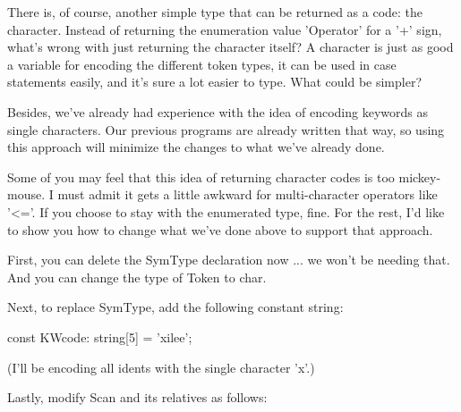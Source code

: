 \documentclass[float=false, crop=false]{standalone}
\begin{document}
There is, of course, another simple type that can be returned as a code: the
character. Instead of returning the enumeration value 'Operator' for a '+' sign,
what's wrong with just returning the character itself? A character is just as
good a variable for encoding the different token types, it can be used in case
statements easily, and it's sure a lot easier to type. What could be simpler?

Besides, we've already had experience with the idea of encoding keywords as
single characters. Our previous programs are already written that way, so using
this approach will minimize the changes to what we've already done.

Some of you may feel that this idea of returning character codes is too
mickey-mouse. I must admit it gets a little awkward for multi-character
operators like '<='. If you choose to stay with the enumerated type, fine. For
the rest, I'd like to show you how to change what we've done above to support
that approach.

First, you can delete the SymType declaration now ... we won't be needing that.
And you can change the type of Token to char.

Next, to replace SymType, add the following constant string:


   const KWcode: string[5] = 'xilee';


(I'll be encoding all idents with the single character 'x'.)


Lastly, modify Scan and its relatives as follows:
\end{document}
